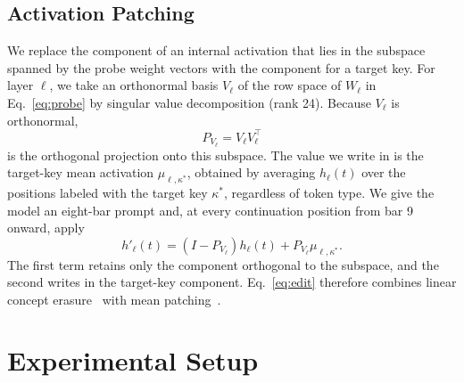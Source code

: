 \documentclass{article}
\begin{document}
\subsection{Activation Patching}
\label{sec:patching}
We replace the component of an internal activation that lies in the subspace spanned by the probe weight vectors with the component for a target key.
For layer $\ell$, we take an orthonormal basis $V_\ell$ of the row space of $W_\ell$ in Eq.~\eqref{eq:probe} by singular value decomposition (rank 24).
Because $V_\ell$ is orthonormal,
\begin{equation}
P_{V_\ell}
=
V_\ell V_\ell^\top
\label{eq:projector}
\end{equation}
is the orthogonal projection onto this subspace.
The value we write in is the target-key mean activation $\mu_{\ell,\kappa^*}$, obtained by averaging $h_\ell(t)$ over the positions labeled with the target key $\kappa^*$, regardless of token type.
We give the model an eight-bar prompt and, at every continuation position from bar 9 onward, apply
\begin{equation}
h'_\ell(t) = \left(I - P_{V_\ell}\right) h_\ell(t)
+ P_{V_\ell}\mu_{\ell,\kappa^*}.
\label{eq:edit}
\end{equation}
The first term retains only the component orthogonal to the subspace, and the second writes in the target-key component. Eq.~\eqref{eq:edit} therefore combines linear concept erasure~\cite{ravfogel2020inlp,leace2023} with mean patching~\cite{wang2023ioi,zhang2024patching}.

\section{Experimental Setup}
\label{sec:setup}
\end{document}
